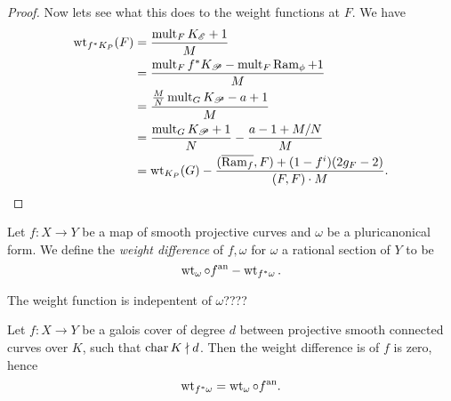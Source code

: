 \begin{proof}
	Now lets see what this does to the weight functions at $F$. 
	We have 
	\begin{align*}
		\operatorname{wt}_{f^* K_P}(F) &= \frac{\operatorname{mult}_F K_{\mathscr E} + 1}{M} \\
		&= \frac{\operatorname{mult}_F f^*K_{\mathscr P} - \operatorname{mult}_F \operatorname{Ram}_\phi + 1}{M} \\
		&= \frac{\frac{M}{N}\operatorname{mult}_G K_{\mathscr P} - a + 1}{M} \\
		&= \frac{\operatorname{mult}_G K_{\mathscr P} + 1}{N} - \frac{a - 1 + M / N}{M} \\
		&= \operatorname{wt}_{K_P}(G) - \frac{(\overline{\operatorname{Ram}_f}, F) + (1 - f^{i})(2g_F - 2)}{(F, F)\cdot M} 
	.\end{align*}
\end{proof}
\begin{definition}
	Let $f: X \to Y$ be a map of smooth projective curves and $\omega$ be a pluricanonical form. 
	We define the \emph{weight difference} of $f, \omega$ for $\omega$ a rational section of $Y$ to be \[
		\operatorname{wt}_{\omega} \circ f{}^{\text{an}} - \operatorname{wt}_{f^* \omega} 
	.\] 
\end{definition}
\begin{remark}
	The weight function is indepentent of  $\omega$???? 
\end{remark}

\begin{corollary}
	Let $f: X \to Y$ be a galois cover of degree $d$ between projective smooth connected curves over $K$, such that $\operatorname{char} K \nmid d$.  
	Then the weight difference is of $f$ is zero, hence \[
	\operatorname{wt}_{f^* \omega} = \operatorname{wt}_{\omega} \circ f{}^{\text{an}}  
	.\] 
\end{corollary}



